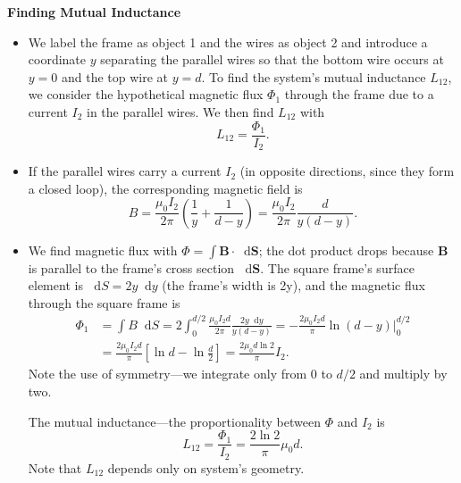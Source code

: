 \documentclass[11pt, a4paper]{article}
\newcommand{\diff}{\mathop{}\!\mathrm{d}} %
\renewcommand{\vec}[1]{\bm{#1}} %
\newcommand{\B}{\vec{B}}  %
\newcommand{\mm}{\mu_{0}}  %
\newcommand{\m}{\vec{m}}  %
\begin{document}
\vspace{2mm}
\textbf{Finding Mutual Inductance}
\begin{itemize}
	\item We label the frame as object 1 and the wires as object 2 and introduce a coordinate $ y $ separating the parallel wires so that the bottom wire occurs at $ y = 0 $ and the top wire at $ y = d $. To find the system's mutual inductance $ L_{12} $, we consider the hypothetical magnetic flux $ \Phi_{1} $ through the frame due to a current $ I_{2} $ in the parallel wires. We then find $ L_{12} $ with
	\begin{equation*}
		L_{12} = \frac{\Phi_{1}}{I_{2}}.
	\end{equation*}
	
	\item If the parallel wires carry a current $ I_{2} $ (in opposite directions, since they form a closed loop), the corresponding magnetic field is
	\begin{equation*}
		B = \frac{\mm I_{2}}{2\pi} \left(\frac{1}{y} + \frac{1}{d-y}\right) =  \frac{\mm I_{2}}{2\pi}  \frac{d}{y(d-y)}.
	\end{equation*}

	
	\item We find magnetic flux with $ \Phi = \int \B \cdot \diff \vec{S} $; the dot product drops because $ \B $ is parallel to the frame's cross section $ \diff \vec{S} $. The square frame's surface element is $ \diff S = 2y\diff y $ (the frame's width is 2y), and the magnetic flux through the square frame is
	\begin{align*}
		\Phi_{1} &= \int B \diff S = 2\int_{0}^{d/2} \frac{\mm I_{2}d}{2\pi}  \frac{2y\diff y}{y(d-y)} = -\frac{2\mm I_{2}d}{\pi} \ln(d-y)\big |_{0}^{d/2}\\
		& =  \frac{2\mm I_{2}d}{\pi} \left[\ln d - \ln\frac{d}{2}\right] =  \frac{2\mm d \ln 2}{\pi}  I_{2}.
	\end{align*}
	Note the use of symmetry---we integrate only from $ 0 $ to $ d/2 $ and multiply by two.
	
	The mutual inductance---the proportionality between $ \Phi $ and $ I_{2} $ is 
	\begin{equation*}
		L_{12} = \frac{\Phi_{1}}{I_{2}} = \frac{2\ln 2}{\pi} \mm d.
	\end{equation*}
	Note that $ L_{12} $ depends only on system's geometry. 
\end{itemize}
\end{document}
